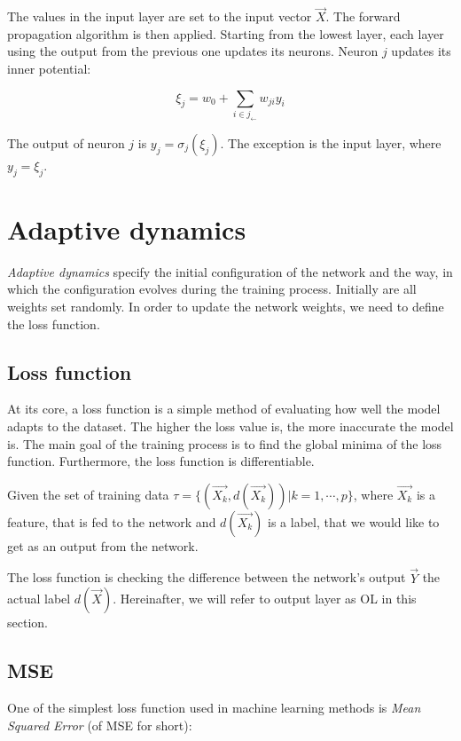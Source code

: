 The values in the input layer are set to the input vector $\overrightarrow{X}$. The forward propagation algorithm is then applied. Starting from the lowest layer, each layer using the output from the previous one updates its neurons. Neuron $j$ updates its inner potential:

$$ \xi_j = w_0 + \sum_{i \in j_{\leftarrow}} w_{ji} y_i $$

The output of neuron $j$ is $y_j = \sigma_j (\xi_j)$. The exception is the input layer, where $y_j = \xi_j$.

\section{Adaptive dynamics}

\textit{Adaptive dynamics} specify the initial configuration of the network and the way, in which the configuration evolves during the training process. Initially are all weights set randomly. In order to update the network weights, we need to define the loss function.

\subsection{Loss function}

At its core, a loss function\cite{loss} is a simple method of evaluating how well the model adapts to the dataset. The higher the loss value is, the more inaccurate the model is. The main goal of the training process is to find the global minima of the loss function. Furthermore, the loss function is differentiable.

Given the set of training data $\tau = \lbrace (\overrightarrow{X_k}, d(\overrightarrow{X_k})) \vert k = 1, \cdots, p \rbrace$, where $\overrightarrow{X_k}$ is a feature, that is fed to the network and $d(\overrightarrow{X_k})$ is a label, that we would like to get as an output from the network.

The loss function is checking the difference between the network's output $\overrightarrow{Y}$ the actual label $d(\overrightarrow{X})$. Hereinafter, we will refer to output layer as OL in this section.

\subsection*{MSE}

One of the simplest loss function used in machine learning methods is \textit{Mean Squared Error} (of MSE for short):

